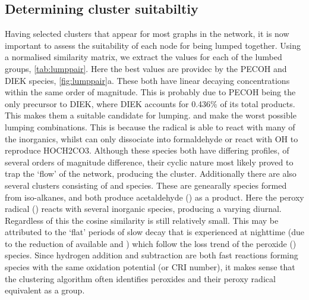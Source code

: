 \subsection{Determining cluster suitabiltiy}
Having selected clusters that appear for most graphs in the network, it is now important to assess the suitability of each node for being lumped together. Using a normalised similarity matrix, we extract the values for each of the lumbed groups, \autoref{tab:lumppair}. Here the best values are providec by the PECOH and DIEK species, \autoref{fig:lumppair}a. These both have linear decaying concentrations within the same order of magnitude. This is probably due to PECOH being the only precursor to DIEK, where DIEK accounts for 0.436\% of its total products. This makes them a suitable candidate for lumping. 
 and  make the worst possible lumping combinations. This is because the radical  is able to react with many of the inorganics, whilst  can only dissociate into formaldehyde or react with OH to reproduce HOCH2CO3. Although these species both have differing profiles, of several orders of magnitude difference, their cyclic nature  most likely proved to trap the `flow' of the network, producing the cluster. Additionally there are also several clusters consisting of  and  species. These are genearally species formed from iso-alkanes, and both produce acetaldehyde () as a product. Here the peroxy radical () reacts with several inorganic species, producing a varying diurnal. Regardless of this the cosine similarity is still relatively small. This may be attributed to the `flat' periods of slow decay that is experienced at nighttime (due to the reduction of available  and ) which follow the loss trend of the peroxide () species. Since hydrogen addition and subtraction are both fast reactions forming species with the same oxidation potential (or CRI number), it makes sense that the clustering algorithm often identifies peroxides and their peroxy radical equivalent as a group. \\


